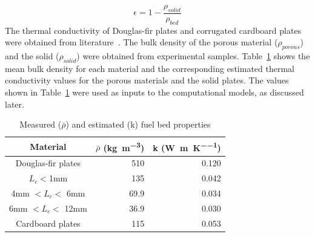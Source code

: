        \begin{equation}
            \epsilon = 1- \frac{\rho_{solid}}{\rho_{bed}}
            \label{eqn:epsilon}
        \end{equation}
    The thermal conductivity of Douglas-fir plates and corrugated cardboard plates were obtained from literature~\cite{Laboratory2010, Asdrubali2015}. The bulk density of the porous material ($\rho_{porous}$) and the solid ($\rho_{solid}$) were obtained from experimental samples. Table~\ref{tab:k_values} shows the mean bulk density for each material and the corresponding estimated thermal conductivity values for the porous materials and the solid plates. The values shown in Table~\ref{tab:k_values} were used as inputs to the computational models, as discussed later. 
        \begin{table}[hpbt]
            \caption{Measured ($\bar{\rho}$) and estimated (k) fuel bed properties}
            \centering
            \begin{tabular}{crr}
                \rowcolor{gray!50}
                Material & $\bar{\rho}$ (\si{\kilo\gram\per\cubic\meter}) & k (\si{\watt\per\meter\per\kelvin}) \\
                \hline
                Douglas-fir plates  & 510   & 0.120 \\
                $L_{c}<$1mm         & 135   & 0.042 \\
                4mm $<L_{c}<$ 6mm   & 69.9  & 0.034 \\
                6mm $<L_{c}<$ 12mm  & 36.9  & 0.030 \\
                Cardboard plates    & 115   & 0.053
            \end{tabular}
            \label{tab:k_values}
        \end{table}


